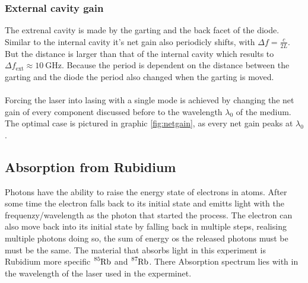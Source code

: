 \subsubsection{External cavity gain}
The extrenal cavity is made by the garting and the back facet of the diode.
Similar to the internal cavity it's net gain also periodicly shifts, with $\Delta f = \frac{c}{2L}$.
\\
But the distance is larger than that of the internal cavity which results to $\Delta f_\text{ext} \approx \SI{10}{\giga\Hz}$.
Because the period is dependent on the distance between the garting and the diode the period also changed when the garting is moved.
\\\\
Forcing the laser into lasing with a single mode is achieved by changing the net gain of every component discussed before to the wavelength $\lambda_0$ of the medium.
The optimal case is pictured in graphic \ref{fig:netgain}, as every net gain peaks at $\lambda_0$.

\subsection{Absorption from Rubidium}
Photons have the ability to raise the energy state of electrons in atoms.
After some time the electron falls back to its initial state and emitts light with the frequenzy/wavelength as the photon that started the process.
The electron can also move back into its initial state by falling back in multiple steps, realising multiple photons doing so, the sum of energy os the released photons must be must be the same.
The material that absorbs light in this experiment is Rubidium more specific $\ce{^{85}Rb}$ and $\ce{^{87}Rb}$.
There Absorption spectrum lies with in the wavelength of the laser used in the experminet.
